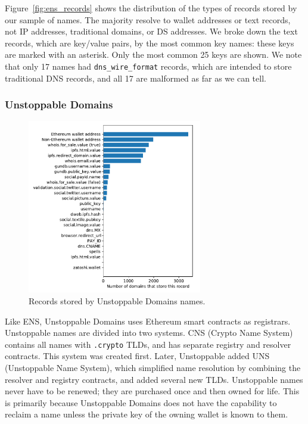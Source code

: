 Figure~\ref{fig:ens_records} shows the distribution of the types of records 
stored by our sample of names. The majority resolve to wallet addresses or text 
records, not IP addresses, traditional domains, or DS addresses. We broke down 
the text records, which are key/value pairs, by the most common key names: 
these keys are marked with an asterisk. Only the most common 25 keys are shown. 
We note that only 17 names had \texttt{dns\_wire\_format} records, which are 
intended to store traditional DNS 
records, and all 17 are malformed as far as we can tell. 

%

\subsubsection{Unstoppable Domains}

\begin{figure}[t]
	\centering
	\includegraphics[width=3in]{figs/all_unstoppable_records.pdf}
	\caption{Records stored by Unstoppable Domains names.}
	\label{fig:unstoppable_records}
\end{figure}


Like ENS, Unstoppable Domains uses Ethereum smart contracts as 
registrars. Unstoppable names are divided into two systems. CNS 
(Crypto Name System) contains all names with \texttt{.crypto} 
TLDs, and has separate registry and resolver contracts. This 
system was created first. Later, Unstoppable added UNS 
(Unstoppable Name System), which simplified name resolution by 
combining the resolver and registry contracts, and added several 
new TLDs. Unstoppable names never have to be renewed; they are 
purchased once and then owned for life. This is primarily 
because Unstoppable Domains does not have the capability to 
reclaim a name unless the private key of the owning wallet is 
known to them. 

